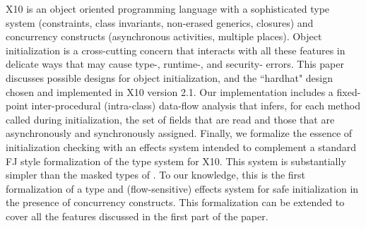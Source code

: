 X10 is an object oriented programming language with a sophisticated
    type system (constraints, class invariants, non-erased generics, closures)
    and concurrency constructs (asynchronous activities, multiple places).
Object initialization is a cross-cutting concern that interacts with all these features
    in delicate ways that may cause type-, runtime-, and security- errors.
This paper discusses possible designs for object initialization,
    and the ``hardhat" design chosen and implemented in X10 version 2.1.
Our implementation includes a
    fixed-point inter-procedural (intra-class)
    data-flow analysis
    that infers, for each method called during initialization,
    the set of fields that are read and
    those that are asynchronously and synchronously assigned.
Finally, we formalize the essence of initialization checking with an
effects system intended to complement a standard FJ style
formalization of the type system for X10. This system is substantially
simpler than the masked types of \cite{XinQi:2009}. To our knowledge, this is
the first formalization of a type and (flow-sensitive) effects system
for safe initialization in the presence of concurrency
constructs. This formalization can be extended to cover all the
features discussed in the first part of the paper.
